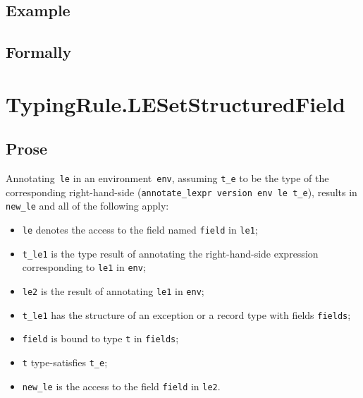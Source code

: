 \documentclass{book}
\begin{document}
\begin{itemize}
  \subsection{Example}



\begin{emptyformal}
    \subsection{Formally}
\end{emptyformal}


\section{TypingRule.LESetStructuredField \label{sec:TypingRule.LESetStructuredField}}

    \subsection{Prose}
   Annotating~\texttt{le} in an environment~\texttt{env}, assuming
\texttt{t\_e} to be the type of the corresponding right-hand-side
(\texttt{annotate\_lexpr version env le t\_e}), results in \texttt{new\_le} and
all of the following apply:
   \begin{itemize}
   \item \texttt{le} denotes the access to the field named \texttt{field} in \texttt{le1};
   \item \texttt{t\_le1} is the type result of annotating the right-hand-side expression corresponding to \texttt{le1} in \texttt{env};
   \item \texttt{le2} is the result of annotating \texttt{le1} in \texttt{env};
   \item \texttt{t\_le1} has the structure of an exception or a record type with fields \texttt{fields};
   \item \texttt{field} is bound to type \texttt{t} in \texttt{fields};
   \item \texttt{t} type-satisfies \texttt{t\_e};
   \item \texttt{new\_le} is the access to the field \texttt{field} in \texttt{le2}.
   \end{itemize}


\end{itemize}
\end{document}
